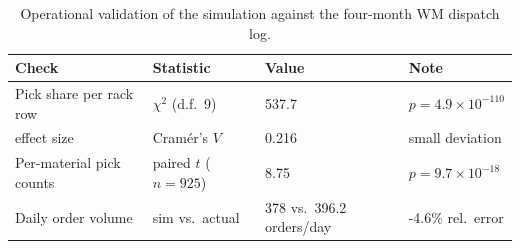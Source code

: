 \begin{table}[htbp]
\centering
\caption{Operational validation of the simulation against the four-month
WM dispatch log.}
\label{tab:validation}
\small
\begin{tabular}{llll}
\toprule
Check & Statistic & Value & Note \\
\midrule
Pick share per rack row & $\chi^2$ (d.f.\ 9) & 537.7 & $p = 4.9 \times 10^{-110}$ \\
\quad effect size & Cram\'er's $V$ & 0.216 & small deviation \\
Per-material pick counts & paired $t$ ($n=925$) & 8.75 & $p = 9.7 \times 10^{-18}$ \\
Daily order volume & sim vs.\ actual & 378 vs.\ 396.2 orders/day & -4.6\% rel.\ error \\
\bottomrule
\end{tabular}
\end{table}
